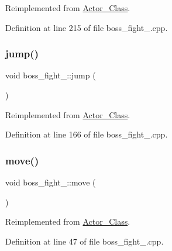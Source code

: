 Reimplemented from \hyperlink{class_actor___class_ac49cd62be76b4b950ecbe155413f1b64}{Actor\+\_\+\+Class}.



Definition at line 215 of file boss\+\_\+fight\+\_.\+cpp.

\hypertarget{classboss__fight__3_ab642323b24a5f139339fffba4749ebdc}{}\label{classboss__fight__3_ab642323b24a5f139339fffba4749ebdc} 
\subsubsection{\texorpdfstring{jump()}{jump()}}
{\footnotesize\ttfamily void boss\+\_\+fight\+\_\+::jump (\begin{DoxyParamCaption}{ }\end{DoxyParamCaption})\hspace{0.3cm}{\ttfamily [virtual]}}



Reimplemented from \hyperlink{class_actor___class_ab33216a3ce0c856bdc16231c71ae35c2}{Actor\+\_\+\+Class}.



Definition at line 166 of file boss\+\_\+fight\+\_.\+cpp.

\hypertarget{classboss__fight__3_ab70b9f8a73d4fd1fe807f09c76a2267a}{}\label{classboss__fight__3_ab70b9f8a73d4fd1fe807f09c76a2267a} 
\subsubsection{\texorpdfstring{move()}{move()}}
{\footnotesize\ttfamily void boss\+\_\+fight\+\_\+::move (\begin{DoxyParamCaption}{ }\end{DoxyParamCaption})\hspace{0.3cm}{\ttfamily [virtual]}}



Reimplemented from \hyperlink{class_actor___class_af1764a94c5410ba8476f56553cd2c327}{Actor\+\_\+\+Class}.



Definition at line 47 of file boss\+\_\+fight\+\_.\+cpp.

\hypertarget{classboss__fight__3_adeca20141361055bcbc3439eb73e34db}{}\label{classboss__fight__3_adeca20141361055bcbc3439eb73e34db} 
